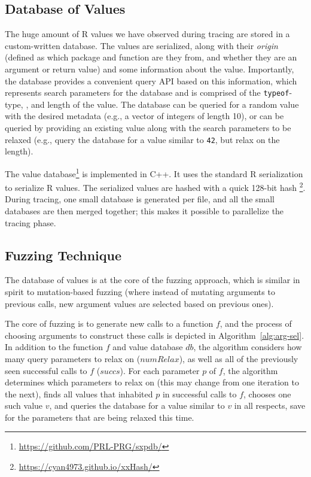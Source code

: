 \documentclass[sigplan,anonymous,review]{acmart}
\begin{document}

\subsection{Database of Values}

The huge amount of R values we have observed during tracing are stored in a custom-written database. 
The values are serialized, along with their \textit{origin} (defined as which package and function are they from, and whether they are an argument or return value) and some information about the value. %
Importantly, the database provides a convenient query API based on this information, which represents search parameters for the database and is comprised of the {\tt typeof}-type, , and length of the value. 
The database can be queried for a random value with the desired metadata (e.g., a vector of integers of length 10), or can be queried by providing an existing value along with the search parameters to be relaxed (e.g., query the database for a value similar to {\tt 42}, but relax on the length).

The value database\footnote{\url{https://github.com/PRL-PRG/sxpdb/}  } is implemented in C++. 
It uses the standard R serialization to serialize R values. 
The serialized values are hashed with a quick 128-bit hash \footnote{\url{https://cyan4973.github.io/xxHash/}}. 
During tracing, one small database is generated per file, and all the small databases are then merged together; this makes it possible to parallelize the tracing phase.

\subsection{Fuzzing Technique }

The database of values is at the core of the fuzzing approach, which is similar in spirit to mutation-based fuzzing (where instead of mutating arguments to previous calls, new argument values are selected based on previous ones).

The core of fuzzing is to generate new calls to a function $f$, and the process of choosing arguments to construct these calls is depicted in Algorithm~\ref{alg:arg-sel}.
In addition to the function $f$ and value database $db$, the algorithm considers how many query parameters to relax on ($numRelax$), as well as all of the previously seen successful calls to $f$ ($succs$).
For each parameter $p$ of $f$, the algorithm determines which parameters to relax on (this may change from one iteration to the next), finds all values that inhabited $p$ in successful calls to $f$, chooses one such value $v$, and queries the database for a value similar to $v$ in all respects, save for the parameters that are being relaxed this time.
\end{document}
